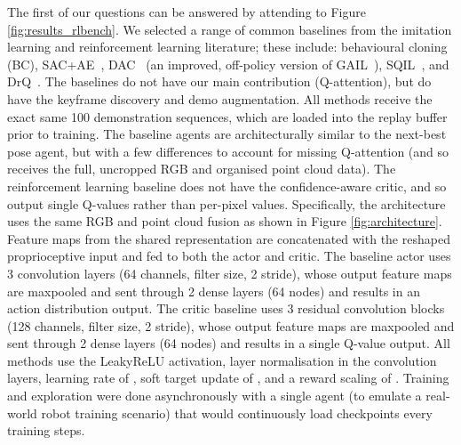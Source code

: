\documentclass[letterpaper, 10 pt, journal, twoside]{IEEEtran}
\begin{document}
The first of our questions can be answered by attending to Figure \ref{fig:results_rlbench}. We selected a range of common baselines from the imitation learning and reinforcement learning literature; these include: behavioural cloning (BC), SAC+AE~\cite{yarats2019improving}, DAC~\cite{kostrikov2018discriminator} (an improved, off-policy version of GAIL~\cite{ho2016generative}), SQIL~\cite{reddy2019sqil}, and DrQ~\cite{kostrikov2020image}. The baselines do not have our main contribution (Q-attention), but do have the keyframe discovery and demo augmentation. All methods receive the exact same 100 demonstration sequences, which are loaded into the replay buffer prior to training. The baseline agents are architecturally similar to the next-best pose agent, but with a few differences to account for missing Q-attention (and so receives the full, uncropped RGB and organised point cloud data). The reinforcement learning baseline does not have the confidence-aware critic, and so output single Q-values rather than per-pixel values. Specifically, the architecture uses the same RGB and point cloud fusion as shown in Figure \ref{fig:architecture}. Feature maps from the shared representation are concatenated with the reshaped proprioceptive input and fed to both the actor and critic. The baseline actor uses 3 convolution layers (64 channels,  filter size, 2 stride), whose output feature maps are maxpooled and sent through 2 dense layers (64 nodes) and results in an action distribution output. The critic baseline uses 3 residual convolution blocks (128 channels,  filter size, 2 stride), whose output feature maps are maxpooled and sent through 2 dense layers (64 nodes) and results in a single Q-value output. All methods use the LeakyReLU activation, layer normalisation in the convolution layers, learning rate of , soft target update of , and a reward scaling of . Training and exploration were done asynchronously with a single agent (to emulate a real-world robot training scenario) that would continuously load checkpoints every  training steps. 
\end{document}
